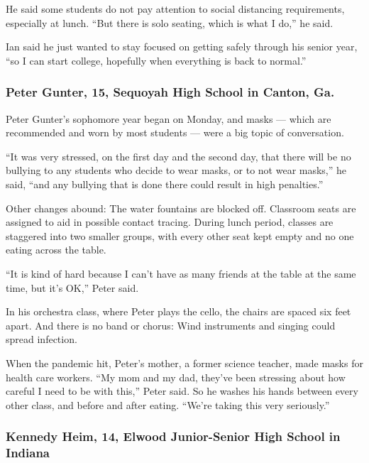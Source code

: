 He said some students do not pay attention to social distancing
requirements, especially at lunch. ``But there is solo seating, which is
what I do,'' he said.

Ian said he just wanted to stay focused on getting safely through his
senior year, ``so I can start college, hopefully when everything is back
to normal.''

\hypertarget{peter-gunter-15-sequoyah-high-school-in-canton-ga}{%
\subsubsection{Peter Gunter, 15, Sequoyah High School in Canton,
Ga.}\label{peter-gunter-15-sequoyah-high-school-in-canton-ga}}

Peter Gunter's sophomore year began on Monday, and masks --- which are
recommended and worn by most students --- were a big topic of
conversation.

``It was very stressed, on the first day and the second day, that there
will be no bullying to any students who decide to wear masks, or to not
wear masks,'' he said, ``and any bullying that is done there could
result in high penalties.''

Other changes abound: The water fountains are blocked off. Classroom
seats are assigned to aid in possible contact tracing. During lunch
period, classes are staggered into two smaller groups, with every other
seat kept empty and no one eating across the table.

``It is kind of hard because I can't have as many friends at the table
at the same time, but it's OK,'' Peter said.

In his orchestra class, where Peter plays the cello, the chairs are
spaced six feet apart. And there is no band or chorus: Wind instruments
and singing could spread infection.

When the pandemic hit, Peter's mother, a former science teacher, made
masks for health care workers. ``My mom and my dad, they've been
stressing about how careful I need to be with this,'' Peter said. So he
washes his hands between every other class, and before and after eating.
``We're taking this very seriously.''

\hypertarget{kennedy-heim-14-elwood-junior-senior-high-school-in-indiana}{%
\subsubsection{Kennedy Heim, 14, Elwood Junior-Senior High School in
Indiana}\label{kennedy-heim-14-elwood-junior-senior-high-school-in-indiana}}


